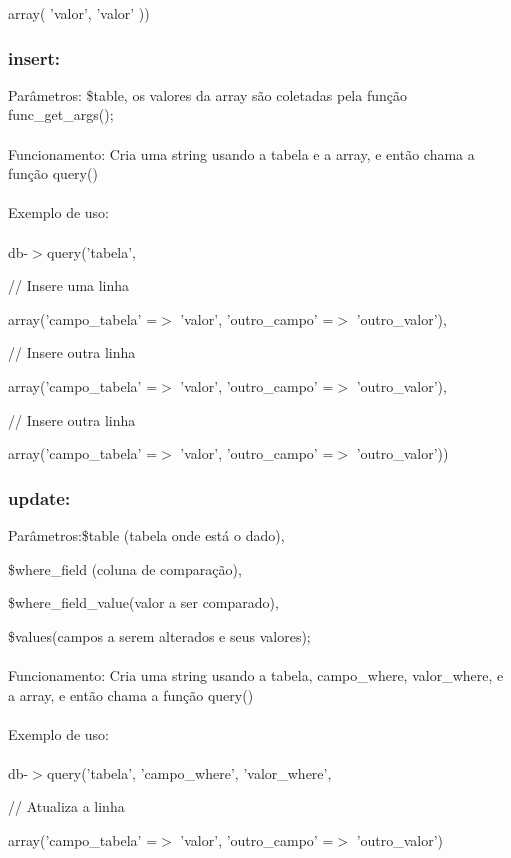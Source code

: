 \documentclass{article}
\begin{document}
			\qquad\qquad array( 'valor', 'valor' )) 

		\subsubsection{insert:}
			Parâmetros: \$table, os valores da array são coletadas pela função func\_get\_args();\\\\
			Funcionamento: Cria uma string usando a tabela e a array, e então chama a função query()\\\\
			Exemplo de uso:\\\\
			db-$>$query('tabela', 
	
						// Insere uma linha
						
						array('campo\_tabela' =$>$ 'valor', 'outro\_campo'  =$>$ 'outro\_valor'),
	
						// Insere outra linha
						
						array('campo\_tabela' =$>$ 'valor', 'outro\_campo'  =$>$ 'outro\_valor'),
	
						// Insere outra linha
						
						array('campo\_tabela' =$>$ 'valor', 'outro\_campo'  =$>$ 'outro\_valor')) 

		\newpage
		\subsubsection{update:}
			Parâmetros:\$table (tabela onde está o dado),
			
			\qquad\qquad\$where\_field (coluna de comparação),
			
			\qquad\qquad\$where\_field\_value(valor a ser comparado),
			
			\qquad\qquad\$values(campos a serem alterados e seus valores);\\\\
			Funcionamento: Cria uma string usando a tabela, campo\_where, valor\_where, e a array, e então chama a função query()\\\\
			Exemplo de uso:\\\\
			db-$>$query('tabela', 'campo\_where', 'valor\_where',
	
					\qquad\qquad// Atualiza a linha
					
					\qquad\qquad array('campo\_tabela' =$>$ 'valor', 'outro\_campo'  =$>$ 'outro\_valor')
\end{document}
